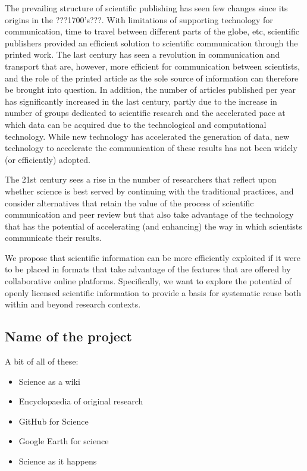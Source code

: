 \documentclass[final,authoryear,3p]{elsarticle-open-drafting}
\begin{document}
The prevailing structure of scientific publishing has seen few changes since its origins in the ???1700's???. With limitations of supporting technology for communication, time to travel between different parts of the globe, etc, scientific publishers provided an efficient solution to scientific communication through the printed work. The last century has seen a revolution in communication and transport that are, however, more efficient for communication between scientists, and the role of the printed article as the sole source of information can therefore be brought into question. In addition, the number of articles published per year has significantly increased in the last century, partly due to the increase in number of groups dedicated to scientific research and the accelerated pace at which data can be acquired due to the technological and computational technology. While new technology has accelerated the generation of data, new technology to accelerate the communication of these results has not been widely (or efficiently) adopted. 

The 21st century sees a rise in the number of researchers that reflect upon whether science is best served by continuing with the traditional practices, and consider alternatives that retain the value of the process of scientific communication and peer review but that also take advantage of the technology that has the potential of accelerating (and enhancing) the way in which scientists communicate their results. 

We propose that scientific information can be more efficiently exploited if it were to be placed in formats that take advantage of the features that are offered by collaborative online platforms. Specifically, we want to explore the potential of openly licensed scientific information to provide a basis for systematic reuse both within and beyond research contexts.





\subsection{Name of the project}
A bit of all of these:
\begin{itemize}
	\item Science as a wiki
	\item Encyclopaedia of original research
	\item GitHub for Science
	\item Google Earth for science
	\item Science as it happens
\end{itemize}
\end{document}
